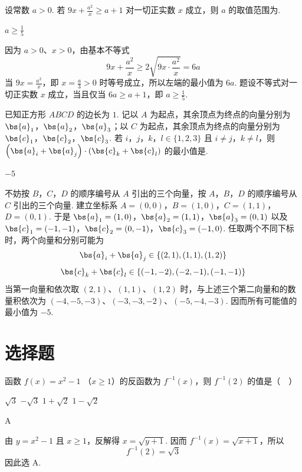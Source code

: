 \begin{problem}
设常数 \(a > 0\). 若 \(9x + \frac{a^2}{x} \geqslant a + 1\) 对一切正实数 \(x\) 成立，则 \(a\) 的取值范围为\fillinblank{}.

\begin{answer}
\(a \geqslant \frac{1}{5}\)
\end{answer}

\begin{solution}
因为 \(a>0\)、\(x>0\)，由基本不等式
\[
9x+\frac{a^2}{x}\geqslant2\sqrt{9x\cdot\frac{a^2}{x}}=6a
\]
当 \(9x=\frac{a^2}{x}\)，即 \(x=\frac{a}{3}>0\) 时等号成立，所以左端的最小值为 \(6a\). 题设不等式对一切正实数 \(x\) 成立，当且仅当 \(6a\geqslant a+1\)，即 \(a\geqslant\frac15\).
\end{solution}
\end{problem}

\begin{problem}
已知正方形 \(ABCD\) 的边长为 \(1\). 记以 \(A\) 为起点，其余顶点为终点的向量分别为 \(\bs{a}_1\)，\(\bs{a}_2\)，\(\bs{a}_3\)；以 \(C\) 为起点，其余顶点为终点的向量分别为 \(\bs{c}_1\)，\(\bs{c}_2\)，\(\bs{c}_3\). 若 \(i\)，\(j\)，\(k\)，\(l \in \{1, 2, 3\}\) 且 \(i \neq j\)，\(k \neq l\)，则 \(\left(\bs{a}_i + \bs{a}_j\right) \cdot \left(\bs{c}_k + \bs{c}_l\right)\) 的最小值是\fillinblank{}.

\begin{answer}
\(-5\)
\end{answer}

\begin{solution}
不妨按 \(B\)，\(C\)，\(D\) 的顺序编号从 \(A\) 引出的三个向量，按 \(A\)，\(B\)，\(D\) 的顺序编号从 \(C\) 引出的三个向量. 建立坐标系
\(A=(0,0)\)，\(B=(1,0)\)，\(C=(1,1)\)，\(D=(0,1)\).
于是
\(\bs{a}_1=(1,0)\)，\(\bs{a}_2=(1,1)\)，\(\bs{a}_3=(0,1)\)
以及
\(\bs{c}_1=(-1,-1)\)，\(\bs{c}_2=(0,-1)\)，\(\bs{c}_3=(-1,0)\).
任取两个不同下标时，两个向量和分别可能为
\[
\bs{a}_i+\bs{a}_j\in\{(2,1),(1,1),(1,2)\}
\]
\[
\bs{c}_k+\bs{c}_l\in\{(-1,-2),(-2,-1),(-1,-1)\}
\]
当第一向量和依次取 \((2,1)\)、\((1,1)\)、\((1,2)\) 时，与上述三个第二向量和的数量积依次为 \((-4,-5,-3)\)、\((-3,-3,-2)\)、\((-5,-4,-3)\). 因而所有可能值的最小值为 \(-5\).
\end{solution}
\end{problem}

\section{选择题}

\begin{problem}
函数 \(f(x) = x^2 - 1\) （\(x \geqslant 1\)）的反函数为 \(f^{-1}(x)\)，则 \(f^{-1}(2)\) 的值是（\(\quad\)）

\choices
    {\(\sqrt{3}\)}
    {\(-\sqrt{3}\)}
    {\(1 + \sqrt{2}\)}
    {\(1 - \sqrt{2}\)}
\begin{answer}
A
\end{answer}

\begin{solution}
由 \(y=x^2-1\) 且 \(x\geqslant1\)，反解得 \(x=\sqrt{y+1}\). 因而 \(f^{-1}(x)=\sqrt{x+1}\)，所以
\[
f^{-1}(2)=\sqrt3
\]
因此选 A.
\end{solution}
\end{problem}

